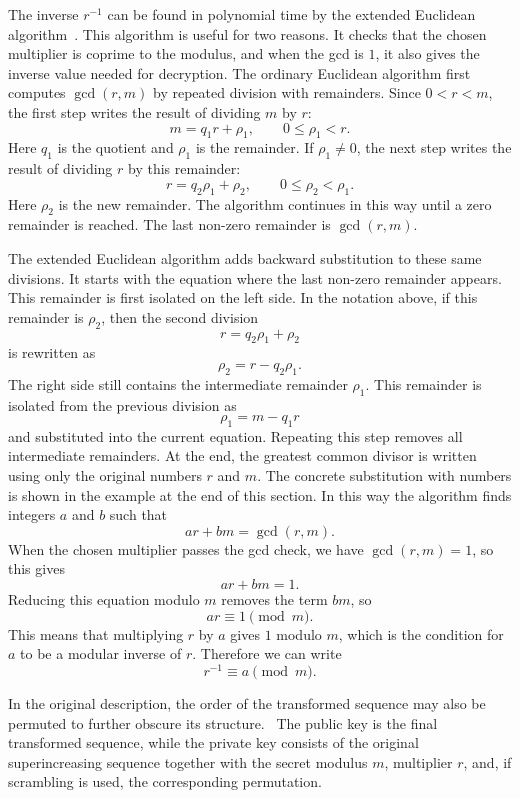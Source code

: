 The inverse $r^{-1}$ can be found in polynomial time by the extended Euclidean
algorithm~\cite[pp.~216--217, p.~492]{stanoyevitch2011}. This algorithm is
useful for two reasons. It checks that the chosen multiplier is coprime to the
modulus, and when the gcd is $1$, it also gives the inverse value needed for
decryption. The ordinary Euclidean algorithm first computes $\gcd(r,m)$ by repeated
division with remainders. Since $0<r<m$, the first step writes the result of dividing $m$ by $r$:
\[
    m = q_1 r + \rho_1,\qquad 0 \le \rho_1 < r.
\]
Here $q_1$ is the quotient and $\rho_1$ is the remainder. If $\rho_1\ne 0$,
the next step writes the result of dividing $r$ by this remainder:
\[
    r = q_2\rho_1 + \rho_2,\qquad 0 \le \rho_2 < \rho_1.
\]
Here $\rho_2$ is the new remainder. The algorithm continues in this way until a
zero remainder is reached. The last non-zero remainder is $\gcd(r,m)$.

The extended Euclidean algorithm adds backward substitution to these same
divisions. It starts with the equation where the last non-zero remainder
appears. This remainder is first isolated on the left side. In the notation
above, if this remainder is $\rho_2$, then the second division
\[
    r = q_2\rho_1 + \rho_2
\]
is rewritten as
\[
    \rho_2 = r - q_2\rho_1.
\]
The right side still contains the intermediate remainder $\rho_1$. This
remainder is isolated from the previous division as
\[
    \rho_1 = m - q_1r
\]
and substituted into the current equation. Repeating this step removes all
intermediate remainders. At the end, the greatest common divisor is written
using only the original numbers $r$ and $m$. The concrete substitution with
numbers is shown in the example at the end of this section. In this way the
algorithm finds integers $a$ and $b$ such that
\[
    ar + bm = \gcd(r,m).
\]
When the chosen multiplier passes the gcd check, we have $\gcd(r,m)=1$, so this gives
\[
    ar + bm = 1.
\]
Reducing this equation modulo $m$ removes the term $bm$, so
\[
    ar \equiv 1 \pmod m.
\]
This means that multiplying $r$ by $a$ gives $1$ modulo $m$, which is the
condition for $a$ to be a modular inverse of $r$. Therefore we can write
\[
    r^{-1}\equiv a \pmod m.
\]


In the original description, the order of the transformed sequence may also be
permuted to further obscure its structure.~\cite[p.~526]{MerkleHellman1978} The
public key is the final transformed sequence, while the private key consists of
the original superincreasing sequence together with the secret modulus $m$,
multiplier $r$, and, if scrambling is used, the corresponding permutation.

